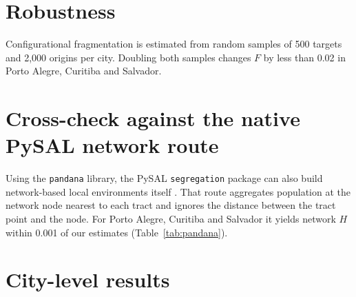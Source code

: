 \section{Robustness}\label{app:robust}

\begin{table}[H]
\centering\footnotesize
\caption{Network versus Euclidean indices under alternative specifications (\nCities{} municipalities). ``Mean
gap (\%)'' is the mean of $100\,(I^{N} - I^{E})/I^{E}$; ``Share gap $>$ 0'' is the share of cities in which the
network index is higher. PP: \emph{preta}+\emph{parda}. Population-matched: Euclidean radii shrunk tract by tract
to match the population of 2-km network environments.}\label{tab:robust}

\end{table}

\begin{table}[H]
\centering\footnotesize
\caption{Street-network topology across the \nCities{} municipalities.}\label{tab:topodesc}
\resizebox{\textwidth}{!}{}
\end{table}

Configurational fragmentation is estimated from random samples of 500 targets and 2,000 origins per city. Doubling
both samples changes $F$ by less than 0.02 in Porto Alegre, Curitiba and Salvador.

\section{Cross-check against the native PySAL network route}\label{app:pandana}

Using the \texttt{pandana} library, the PySAL \texttt{segregation} package can also build network-based
local environments itself \citep{cortes2026segregation}. That route aggregates population at the network node nearest to
each tract and ignores the distance between the tract point and the node. For Porto Alegre, Curitiba and Salvador
it yields network $H$ within 0.001 of our estimates (Table~\ref{tab:pandana}).

\begin{table}[H]
\centering\small
\caption{Network $H$ from our tract-to-tract weights and from \texttt{segregation}'s native \texttt{pandana}
route.}\label{tab:pandana}

\end{table}

\section{City-level results}\label{app:cities}

{\footnotesize

}
